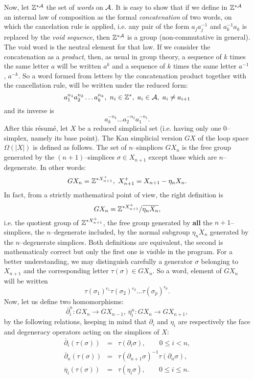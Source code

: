 Now, let ${\Bbb Z}^{*{\cal A}}$ the set of {\em  words} on $\cal A$.
It is easy to show that if we define in ${\Bbb Z}^{*{\cal A}}$ an internal law of composition as the
formal {\em concatenation} of two words,
on which the cancelation rule is applied, i.e. any pair of the form 
$a_ja_j^{-1}$ and $a_k^{-1}a_k$ is replaced by the {\em void sequence},
then ${\Bbb Z}^{*{\cal A}}$ is a group (non-commutative in general). 
The void word is the neutral element for that law. If we consider
the concatenation as a  {\em product}, then, as usual in group theory, 
a sequence of $k$ times the same letter $a$
will be written $a^k$ and a sequence of $k$ times the same letter $a^{-1}$,
$a^{-k}$. So a word 
formed from letters by the  concatenation product together with the cancellation rule, 
will be written under the reduced form:
$$a_1^{n_1}a_2^{n_2}\ldots a_k^{n_k},\ n_i\in {{\Bbb Z}}^*,\ a_i\in {\cal A},\  a_i \not= a_{i+1}$$
and its inverse is
$$a_k^{-n_k}\ldots a_2^{-n_2}a_1^{-n_1}.$$
After this r\'esum\'e, let $X$ be a reduced simplicial set (i.e. having only one $0$--simplex,
namely its base point). The Kan simplicial version $GX$ 
of the loop space $\Omega(|X|)$ is defined as follows.
The set of $n$--simplices $GX_n$ is the free group generated by the $(n+1)$--simplices 
$\sigma \in X_{n+1}$ except those which are $n$--degenerate. In other words:
$$ GX_n=\Z^{*X^+_{n+1}},\ X^+_{n+1}=X_{n+1}-\eta_n X_n. $$
In fact, from a strictly mathematical point of view, the right definition is 
$$ GX_n = {\Bbb Z}^{*X^+_{n+1}} / {\overline{\eta_n X_n}},$$
i.e. the quotient group of ${\Bbb Z}^{*X^+_{n+1}}$, the free group generated by {\bf all} the $n+1$--simplices,
the $n$--degenerate included, by  the normal subgroup ${\overline{\eta_n X_n}}$ generated by
the $n$--degenerate simplices. Both definitions are equivalent, the second is mathematicaly
correct but only the first one is visible in the program.
\vskip 0.35cm
For a better understanding, we may distinguish carefully a generator $\sigma$ belonging to  $X_{n+1}$ and
the corresponding letter  $\tau (\sigma) \in GX_n$. So a word, element
of $GX_n$ will be written 
$${\tau(\sigma_1)}^{\epsilon_1} {\tau(\sigma_2)}^{\epsilon_2} \ldots {\tau(\sigma_p)}^{\epsilon_p}.$$
Now, let us define two homomorphisms:
$$ \overline{\partial}_i^n: GX_n \longrightarrow GX_{n-1},\ \overline{\eta}_i^n: GX_n \longrightarrow GX_{n+1},$$
by the following relations, keeping in mind that $\partial_i$ and $\eta_i$ are respectively the face
and degeneracy operators acting on the  simplices of  $X$:
\begin{eqnarray*}
\overline{\partial}_i(\tau(\sigma))  & = & \tau(\partial_i\sigma),\qquad 0 \leq i < n, \\
\overline{\partial}_n(\tau(\sigma))  & = & \tau(\partial_{n+1}\sigma)^{-1}\tau(\partial_n\sigma), \\
\overline{\eta}_i(\tau(\sigma))    & = & \tau(\eta_i\sigma),\qquad 0 \leq i \leq n.
\end{eqnarray*}
